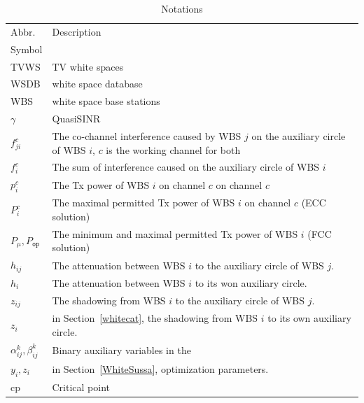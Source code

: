 \documentclass[times]{ettauth}
\theoremstyle{mytheoremstyle}
\theoremstyle{mytheoremstyle}
\theoremstyle{mytheoremstyle}
\begin{document}


\begin{table}[h]
\caption{Notations}
\label{tab1}
\centering
\begin{tabular}{l p{5.5cm}}
\toprule
Abbr. & Description \\
Symbol & \\
\midrule
TVWS & TV white spaces\\
WSDB & white space database\\
WBS & white space base stations\\
$\gamma$ & QuasiSINR\\
$f_{ji}^c$  & The co-channel interference caused by WBS $j$ on the auxiliary circle of WBS $i$, $c$ is the working channel for both\\
$f_i^c$ & The sum of interference caused on the auxiliary circle of WBS $i$ \\
$p_i^c$		& The Tx power of WBS $i$ on channel $c$ on channel $c$\\
$P_i^c$		& The maximal permitted Tx power of WBS $i$ on channel $c$ (ECC solution)\\
$P_\mu, P_{\mathtt{op}}$		& The minimum and maximal permitted Tx power of WBS $i$ (FCC solution)\\
$h_{ij}$ & The attenuation between WBS $i$ to the auxiliary circle of WBS $j$.\\
$h_{i}$ & The attenuation between WBS $i$ to its won auxiliary circle.\\
$z_{ij}$ & The shadowing from WBS $i$ to the auxiliary circle of WBS $j$.\\
$z_{i}$ & in Section~\ref{whitecat}, the shadowing from WBS $i$ to its own auxiliary circle.\\
$\alpha_{ij}^k,\beta_{ij}^k$ & Binary auxiliary variables in the\\
$y_i, z_i$ & in Section~\ref{WhiteSussa}, optimization parameters.\\
$\text{cp}$ & Critical point\\
\bottomrule
\end{tabular}
\end{table}
\end{document}
